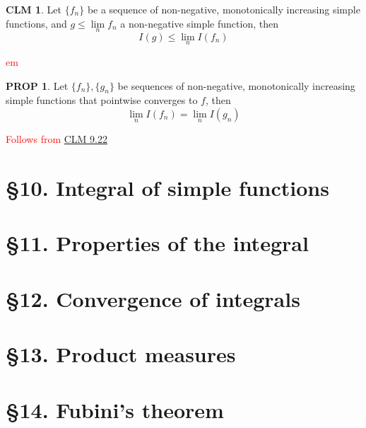 \documentclass[hidelinks]{article}
\theoremstyle{definition}
\theoremstyle{dotless}
\newtheorem{proposition}{PROP}[section]
\newtheorem{claim}{CLM}[section]
\theoremstyle{remark}
\begin{document}
\begin{claim}\label{CLM 9.22}
Let $\{f_n\}$ be a sequence of non-negative, monotonically increasing simple functions, and $g\leq\lim\limits_nf_n$ a non-negative simple function, then
\[I(g)\leq\lim\limits_nI(f_n)\]
\end{claim}
\textcolor{red}{em}

\begin{proposition}
Let $\{f_n\},\{g_n\}$ be sequences of non-negative, monotonically increasing simple functions that pointwise converges to $f$, then
\[\lim_nI(f_n)=\lim_nI(g_n)\]
\end{proposition}
\textcolor{red}{Follows from \hyperref[CLM 9.22]{CLM 9.22}}

\bigbreak

\section*{\S10. Integral of simple functions}
\setcounter{section}{10}

\bigbreak

\section*{\S11. Properties of the integral}
\setcounter{section}{11}

\bigbreak

\section*{\S12. Convergence of integrals}
\setcounter{section}{12}

\bigbreak

\section*{\S13. Product measures}
\setcounter{section}{13}

\bigbreak

\section*{\S14. Fubini's theorem}
\setcounter{section}{14}
\end{document}
